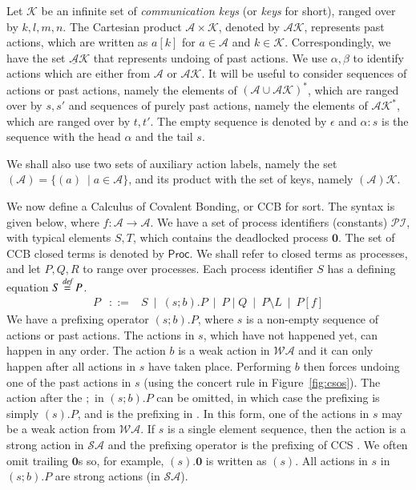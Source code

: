 \documentclass[review]{elsarticle}
\newcommand{\paral}{\; \vert \;}
\newcommand{\Proc}{\mathsf{Proc}}
\newcommand{\restrict}[1]{\!\setminus\!#1}
\newcommand{\mA}{\mathcal{A}}
\newcommand{\mSA}{\mathcal{SA}}
\newcommand{\mWA}{\mathcal{WA}}
\newcommand{\mAK}{\mathcal{AK}}
\newcommand{\umAK}{\underline{\mathcal{A}}\mathcal{K}}
\newcommand{\PI}{\mathcal{PI}}
\newcommand{\Nil}{\mathbf{0}}
\newcommand{\Keys}{\mathcal{K}}
\newcommand{\bydef}{\stackrel{\emph{def}}{=}}
\begin{document}
Let $\Keys$ be an infinite set of {\em communication keys} (or {\em keys}
for short), ranged over by $k,l, m,n$. The Cartesian product $\mathcal A \times \Keys$, denoted by $\mAK$,
represents past actions, which are written as $a[k]$ for $a\in \mA$ and $k\in\Keys$. 
Correspondingly, we have the set $\umAK$ that represents undoing of past actions. 
We use $\alpha, \beta$ to identify actions which are either from $\mA$ or $\mAK$. It will be 
useful to consider sequences of actions or past actions, namely the elements of $(\mA \cup \mAK)^*$, 
which are ranged over by $s,s'$ and sequences of purely past actions, namely the elements of $\mAK^*$, 
which are ranged over by $t,t'$. The empty sequence is denoted by $\epsilon$ and $\alpha:s$
is the sequence with the head $\alpha$ and the tail $s$.

We shall also use two sets of auxiliary action labels, namely the set $(\mA) =\{ (a)\ \mid a\in\mA\}$, 
and its product with the set of keys, namely $(\mA)\Keys$.

We now define a Calculus of Covalent Bonding, or CCB for sort. The syntax is given below, where 
$f:\mA \rightarrow \mA$. 
We have a set of process identifiers (constants) $\PI$, with typical elements $S,T$, which 
contains the deadlocked process $\Nil$. 
The set of CCB closed terms is denoted by $\Proc$. We shall refer to closed terms as processes, and  
let $P,Q, R$ to range over processes.
Each process identifier $S$ has a defining equation $S\bydef P$. 
$$\begin{array}{lll}
	P & ::= &  S \ \mid \ (s;b).P \ \mid \ P\paral Q \ \mid \ P\restrict L \ \mid \ P[f]
\end{array}$$
We have a prefixing operator
$(s;b).P$, where $s$ is a non-empty sequence of actions or past actions. 
The actions in $s$, which have not happened yet,
can happen in any order. The action $b$ is a weak action in $\mWA$ and it can only happen after all
actions in $s$ have taken place. 
Performing $b$ then forces undoing one of the past actions in $s$ 
(using the concert rule in Figure~\ref{fig:csos}).
The action after the $;$ in $(s;b).P$ can be omitted, in which case the prefixing 
is simply $(s).P$, and is the prefixing in \cite{PUY12}. In this form, one of the actions 
in $s$ may be a weak action from $\mWA$. If $s$ is
a single element sequence, then the action is a strong action in $\mSA$ and
the prefixing operator is the prefixing of CCS \cite{Mil80}. 
We often omit trailing $\Nil$s so, for example, $(s).\Nil$ is written as $(s)$. All actions in 
$s$ in $(s;b).P$ are strong actions (in $\mSA$).
\end{document}

